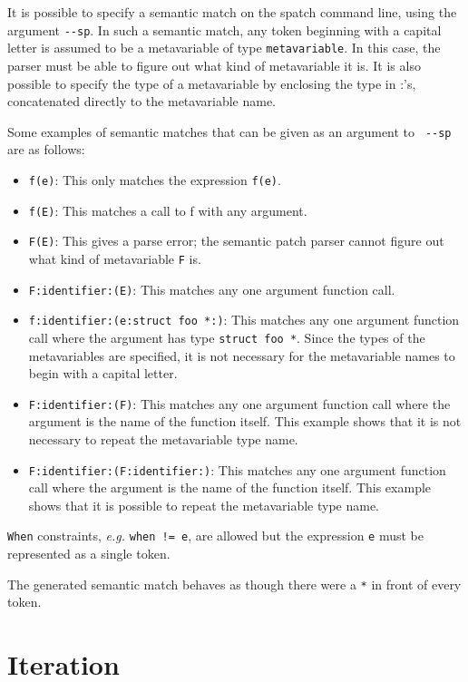 It is possible to specify a semantic match on the spatch command line,
using the argument {\tt -{}-sp}.  In such a semantic match, any token
beginning with a capital letter is assumed to be a metavariable of type
{\tt metavariable}.  In this case, the parser must be able to figure out what
kind of metavariable it is.  It is also possible to specify the type of a
metavariable by enclosing the type in :'s, concatenated directly to the
metavariable name.

Some examples of semantic matches that can be given as an argument to {\tt
  -{}-sp} are as follows:

\begin{itemize}
\item \texttt{f(e)}: This only matches the expression \texttt{f(e)}.
\item \texttt{f(E)}: This matches a call to f with any argument.
\item \texttt{F(E)}: This gives a parse error; the semantic patch parser
  cannot figure out what kind of metavariable \texttt{F} is.
\item \texttt{F:identifier:(E)}: This matches any one argument function
  call.
\item \texttt{f:identifier:(e:struct foo *:)}: This matches any one
  argument function call where the argument has type \texttt{struct foo
    *}.  Since the types of the metavariables are specified, it is not
  necessary for the metavariable names to begin with a capital letter.
\item \texttt{F:identifier:(F)}: This matches any one argument function call
  where the argument is the name of the function itself.  This example
  shows that it is not necessary to repeat the metavariable type name.
\item \texttt{F:identifier:(F:identifier:)}: This matches any one argument
  function call
  where the argument is the name of the function itself.  This example
  shows that it is possible to repeat the metavariable type name.
\end{itemize}

\texttt{When} constraints, \textit{e.g.} \texttt{when != e}, are allowed
but the expression \texttt{e} must be represented as a single token.

The generated semantic match behaves as though there were a \texttt{*} in front
of every token.

\section{Iteration}

